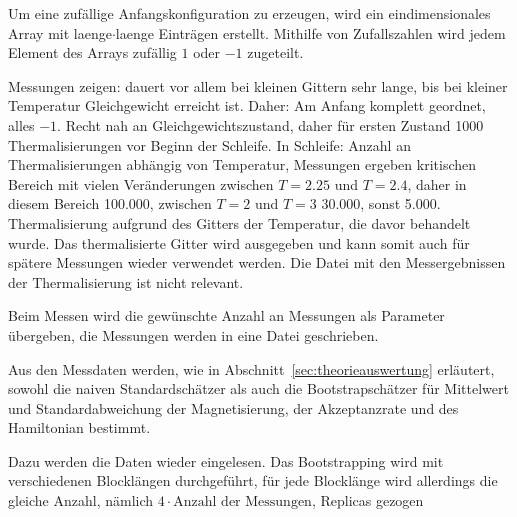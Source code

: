 	Um eine zufällige Anfangskonfiguration zu erzeugen, wird ein eindimensionales Array mit laenge$\cdot$laenge Einträgen erstellt. Mithilfe von Zufallszahlen wird jedem Element des Arrays zufällig $1$ oder $-1$ zugeteilt.	
	
	Messungen zeigen: dauert vor allem bei kleinen Gittern sehr lange, bis bei kleiner Temperatur Gleichgewicht erreicht ist. Daher: Am Anfang komplett geordnet, alles $-1$. 
	Recht nah an Gleichgewichtszustand, daher für ersten Zustand 1000 Thermalisierungen vor Beginn der Schleife. In Schleife: Anzahl an Thermalisierungen abhängig von Temperatur, Messungen ergeben kritischen Bereich mit vielen Veränderungen zwischen $T=\num{2,25}$ und $T=\num{2,4}$, daher in diesem Bereich 100.000, zwischen $T=\num{2}$ und $T=\num{3}$ 30.000, sonst 5.000. Thermalisierung aufgrund des Gitters der Temperatur, die davor behandelt wurde.
	Das thermalisierte Gitter wird ausgegeben und kann somit auch für spätere Messungen wieder verwendet werden. Die Datei mit den Messergebnissen der Thermalisierung ist nicht relevant.
	
	Beim Messen wird die gewünschte Anzahl an Messungen als Parameter übergeben, die Messungen werden in eine Datei geschrieben.
	
	Aus den Messdaten werden, wie in Abschnitt~\ref{sec:theorieauswertung} erläutert, sowohl die naiven Standardschätzer als auch die Bootstrapschätzer für Mittelwert und Standardabweichung der Magnetisierung, der Akzeptanzrate und des Hamiltonian bestimmt.
	
	Dazu werden die Daten wieder eingelesen. Das Bootstrapping wird mit verschiedenen Blocklängen durchgeführt, für jede Blocklänge wird allerdings die gleiche Anzahl, nämlich $4\cdot\text{Anzahl der Messungen}$, Replicas gezogen
	
	
